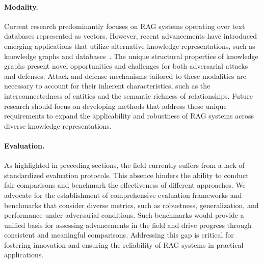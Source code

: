 \paragraph{Modality.}
Current research predominantly focuses on RAG systems operating over text databases represented as vectors. However, recent advancements have introduced emerging applications that utilize alternative knowledge representations, such as knowledge graphs and databases~\cite{ni2024trustworthyknowledgegraphreasoning}. The unique structural properties of knowledge graphs present novel opportunities and challenges for both adversarial attacks and defenses. Attack and defense mechanisms tailored to these modalities are necessary to account for their inherent characteristics, such as the interconnectedness of entities and the semantic richness of relationships. Future research should focus on developing methods that address these unique requirements to expand the applicability and robustness of RAG systems across diverse knowledge representations.

\paragraph{Evaluation.}
As highlighted in preceding sections, the field currently suffers from a lack of standardized evaluation protocols. This absence hinders the ability to conduct fair comparisons and benchmark the effectiveness of different approaches. We advocate for the establishment of comprehensive evaluation frameworks and benchmarks that consider diverse metrics, such as robustness, generalization, and performance under adversarial conditions. Such benchmarks would provide a unified basis for assessing advancements in the field and drive progress through consistent and meaningful comparisons. Addressing this gap is critical for fostering innovation and ensuring the reliability of RAG systems in practical applications.

